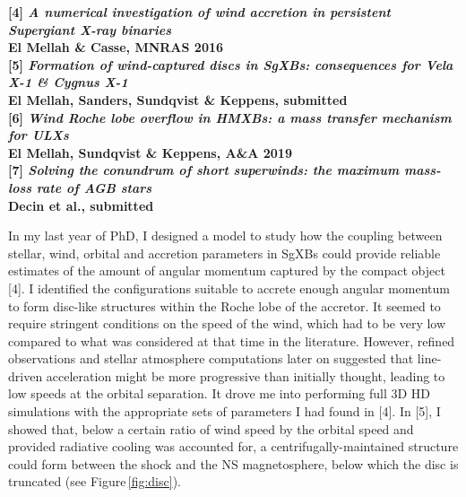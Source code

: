 \documentclass[letterpaper,12pt,onecolumn]{article}
\makeatletter
\newcommand{\sgxs}{SgXBs\xspace}
\newcommand*{\hmxb}{HMXB\@\xspace}
\newcommand*{\ns}{NS\@\xspace}
\makeatother
\begin{document}
\footnotesize
\textbf{[4] \textit{A numerical investigation of wind accretion in persistent Supergiant X-ray binaries}}\\
\hspace*{16pt}\textbf{El Mellah \& Casse, MNRAS 2016}\\
\textbf{[5] \textit{Formation of wind-captured discs in SgXBs: consequences for Vela X-1 \& Cygnus X-1}}\\
\hspace*{16pt}\textbf{El Mellah, Sanders, Sundqvist \& Keppens, submitted}\\
\textbf{[6] \textit{Wind Roche lobe overflow in HMXBs: a mass transfer mechanism for ULXs}}\\
\hspace*{16pt}\textbf{El Mellah, Sundqvist \& Keppens, A\&A 2019}\\
\textbf{[7] \textit{Solving the conundrum of short superwinds: the maximum mass-loss rate of AGB stars}}\\
\hspace*{16pt}\textbf{Decin et al., submitted}\\

\normalsize


In my last year of PhD, I designed a model to study how the coupling between stellar, wind, orbital and accretion parameters in \sgxs could provide reliable estimates of the amount of angular momentum captured by the compact object [4]. I identified the configurations suitable to accrete enough angular momentum to form disc-like structures within the Roche lobe of the accretor. It seemed to require stringent conditions on the speed of the wind, which had to be very low compared to what was considered at that time in the literature. However, refined observations and stellar atmosphere computations later on suggested that line-driven acceleration might be more progressive than initially thought, leading to low speeds at the orbital separation. It drove me into performing full 3D HD simulations with the appropriate sets of parameters I had found in [4]. In [5], I showed that, below a certain ratio of wind speed by the orbital speed and provided radiative cooling was accounted for, a centrifugally-maintained structure could form between the shock and the \ns magnetosphere, below which the disc is truncated (see Figure\,\ref{fig:disc}). 
\end{document}
